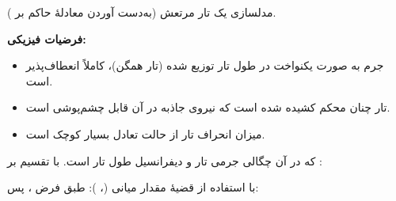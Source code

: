 \EMhold


\begin{EMunit}

مدلسازی یک تار مرتعش (به‌دست آوردن معادلهٔ حاکم بر ).

\textbf{فرضیات فیزیکی:}

\begin{itemize}
\tightlist
\item
  جرم به صورت یکنواخت در طول تار توزیع شده (تار همگن)، کاملاً انعطاف‌پذیر است.
\item
  تار چنان محکم کشیده شده است که نیروی جاذبه در آن قابل چشم‌پوشی است.
\item
  میزان انحراف تار از حالت تعادل بسیار کوچک است.
\end{itemize}


\end{EMunit}

\begin{EMunit}

که در آن \EMim{\rho} چگالی جرمی تار و  دیفرانسیل طول تار است. با تقسیم بر :

با استفاده از قضیهٔ مقدار میانی (، ):
طبق فرض ، پس:

\end{EMunit}

